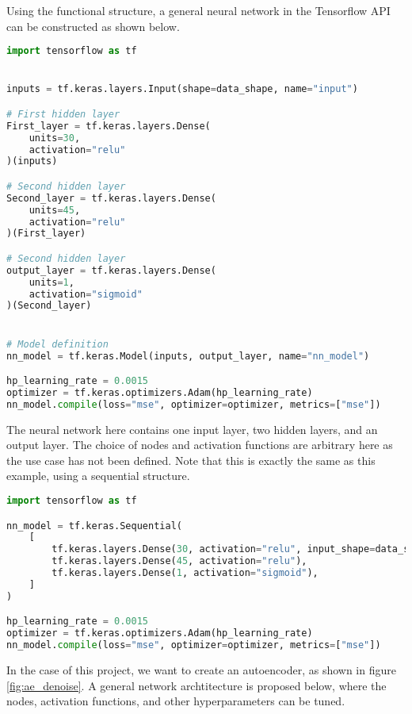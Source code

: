Using the functional structure, a general neural network in the Tensorflow API can be constructed as shown below. 
\begin{lstlisting}[language=Python, style=pythonstyle, label={code:python_func_example_general}]
import tensorflow as tf


inputs = tf.keras.layers.Input(shape=data_shape, name="input")

# First hidden layer
First_layer = tf.keras.layers.Dense(
    units=30,
    activation="relu"
)(inputs)

# Second hidden layer
Second_layer = tf.keras.layers.Dense(
    units=45, 
    activation="relu"
)(First_layer)

# Second hidden layer
output_layer = tf.keras.layers.Dense(
    units=1, 
    activation="sigmoid"
)(Second_layer)


# Model definition
nn_model = tf.keras.Model(inputs, output_layer, name="nn_model")

hp_learning_rate = 0.0015
optimizer = tf.keras.optimizers.Adam(hp_learning_rate)
nn_model.compile(loss="mse", optimizer=optimizer, metrics=["mse"]) 
\end{lstlisting}
The neural network here contains one input layer, two hidden layers, and an output layer. The choice of nodes and activation functions are 
arbitrary here as the use case has not been defined. Note that this is exactly the same as this example, using a sequential structure.


\begin{lstlisting}[language=Python, style=pythonstyle, label={code:python_seq_example}]
import tensorflow as tf

nn_model = tf.keras.Sequential(
    [
        tf.keras.layers.Dense(30, activation="relu", input_shape=data_shape),
        tf.keras.layers.Dense(45, activation="relu"),
        tf.keras.layers.Dense(1, activation="sigmoid"),
    ]
)

hp_learning_rate = 0.0015
optimizer = tf.keras.optimizers.Adam(hp_learning_rate)
nn_model.compile(loss="mse", optimizer=optimizer, metrics=["mse"]) 
\end{lstlisting}

In the case of this project, we want to create an autoencoder, as shown in figure \ref{fig:ae_denoise}. A general network archtitecture is proposed below, 
where the nodes, activation functions, and other hyperparameters can be tuned. 


